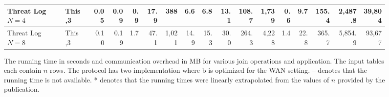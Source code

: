 \begin{figure*}[t!]
\begin{tabular}{|l |l|| r | r |r |r|r||r | r |r |r|r||r|r|r|r|r|}
	Threat Log $N=4$              & This                          \hfill ,3      & 0.05    & 0.09     & 0.9      & 17.9        &        388 &   6.6 & 6.8      & 13.1     & 108.7     &      1,739 &   0.6 &      9.7 &    155.4 &     2,487.8 &      39,804 \\ \hline
	Threat Log $N=8$              & This                          \hfill ,3      & 0.10    & 0.19     & 1.7      & 47.1        &      1,021 &  14.9 & 15.3     & 30.0     & 264.3     &      4,228 &   1.4 &     22.8 &    365.7 &     5,854.9 &      93,677 \\ \hline
\end{tabular}
\vspace{-0.3cm}
\caption{	\label{fig:compare}The running time in seconds and  communication overhead in MB for various join operations and application. The input tables each contain $n$ rows. The  \cite{PSWW18} protocol has two implementation where  \cite{PSWW18}b is optimized for the WAN setting. -- denotes that the running time is not available. * denotes that the running times were linearly extrapolated from the values of $n$ provided by the publication.}
\vspace{-0.2cm}
\end{figure*}



